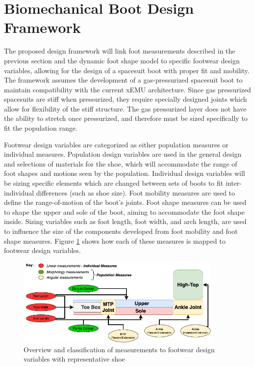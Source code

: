 \documentclass[defaultstyle,11pt]{comps}
\begin{document}
\hypertarget{biomechanical-boot-design-framework}{%
\section{Biomechanical Boot Design Framework}\label{biomechanical-boot-design-framework}}

The proposed design framework will link foot measurements described in the previous section and the dynamic foot shape model to specific footwear design variables, allowing for the design of a spacesuit boot with proper fit and mobility.
The framework assumes the development of a gas-pressurized spacesuit boot to maintain compatibility with the current xEMU architecture.
Since gas pressurized spacesuits are stiff when pressurized, they require specially designed joints which allow for flexibility of the stiff structure.
The gas pressurized layer does not have the ability to stretch once pressurized, and therefore must be sized specifically to fit the population range.

Footwear design variables are categorized as either population measures or individual measures.
Population design variables are used in the general design and selections of materials for the shoe, which will accommodate the range of foot shapes and motions seen by the population.
Individual design variables will be sizing specific elements which are changed between sets of boots to fit inter-individual differences (such as shoe size).
Foot mobility measures are used to define the range-of-motion of the boot's joints.
Foot shape measures can be used to shape the upper and sole of the boot, aiming to accommodate the foot shape inside.
Sizing variables such as foot length, foot width, and arch length, are used to influence the size of the components developed from foot mobility and foot shape measures.
Figure \ref{fig:SA3-Overview} shows how each of these measures is mapped to footwear design variables.

\begin{figure}
\hypertarget{fig:SA3-Overview}{%
\centering
\includegraphics[width=0.9\textwidth,height=\textheight]{../fig/SA3/Overview.png}
\caption{Overview and classification of measurements to footwear design variables with representative shoe}\label{fig:SA3-Overview}
}
\end{figure}
\end{document}
